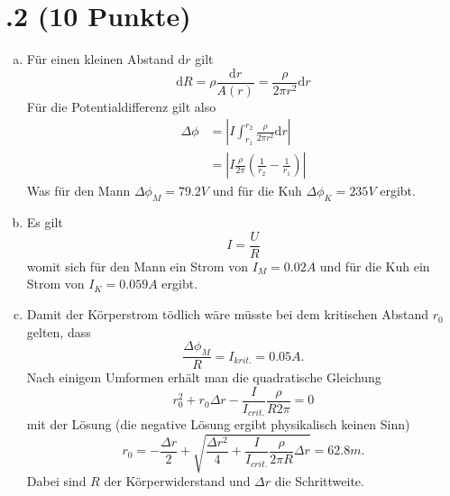 \section*{\nr.2 \tittwo (10 Punkte)}
\begin{enumerate}[(a)]
\item Für einen kleinen Abstand $\mathrm{d}r$ gilt
\begin{equation}
  \mathrm{d}R=\rho \frac{\mathrm{d}r}{A(r)}=\frac{\rho}{2\pi r^2}\mathrm{d}r
\end{equation}
Für die Potentialdifferenz gilt also
\begin{align}
  \Delta\phi&=\left|I\int_{r_1}^{r_2}\frac{\rho}{2\pi r^2}\mathrm{d}r\right|\\
  &=\left|I \frac{\rho}{2\pi}\left(\frac{1}{r_2}-\frac{1}{r_1}\right)\right|
\end{align}
Was für den Mann $\Delta \phi_M=79.2V$ und für die Kuh $\Delta \phi_K=235V$ ergibt.
\item Es gilt
\begin{equation}
  I=\frac{U}{R}
\end{equation}
womit sich für den Mann ein Strom von $I_M=0.02A$ und für die Kuh ein Strom von $I_K=0.059A$ ergibt.
\item Damit der Körperstrom tödlich wäre müsste bei dem kritischen Abstand $r_0$ gelten, dass
\begin{equation}
  \frac{\Delta \phi_M}{R}=I_{krit.}=0.05A.
\end{equation}
Nach einigem Umformen erhält man die quadratische Gleichung 
\begin{equation}
  r_0^2+r_0\Delta r- \frac{I}{I_{crit.}}\frac{\rho}{R2\pi}=0
\end{equation}
mit der Lösung (die negative Lösung ergibt physikalisch keinen Sinn)
\begin{equation}
  r_0=-\frac{\Delta r}{2}+\sqrt{\frac{\Delta r^2}{4}+\frac{I}{I_{crit.}}\frac{\rho}{2\pi R}\Delta r}=62.8m.
\end{equation}
Dabei sind $R$ der Körperwiderstand und $\Delta r$ die Schrittweite.

\end{enumerate}